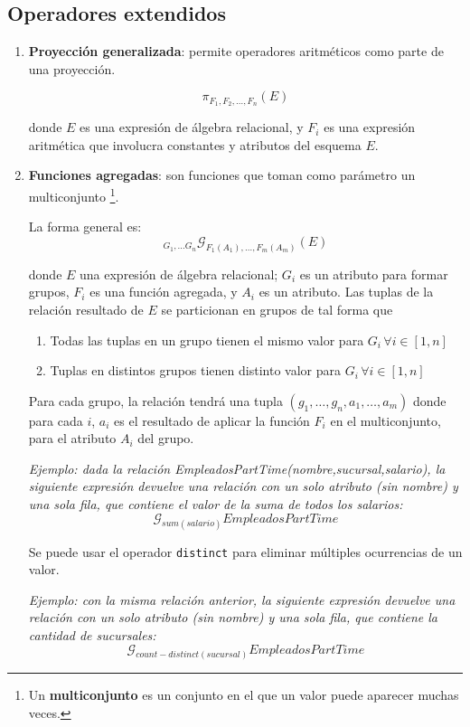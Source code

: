 \documentclass[a4paper, twoside]{article}
\newcommand{\codedir}{../resources/code} %
\begin{document}
\subsection{Operadores extendidos}
\begin{enumerate}
	\item \textbf{Proyección generalizada}: permite operadores aritméticos como parte de una proyección.

	\[
		\pi_{F_{1},F_{2},\dots,F_{n}}(E)
	\]

	donde $E$ es una expresión de álgebra relacional, y $F_{i}$ es una expresión aritmética que involucra constantes y atributos del esquema $E$.

	\item \textbf{Funciones agregadas}: son funciones que toman como parámetro un multiconjunto \footnote{Un \textbf{multiconjunto} es un conjunto en el que un valor puede aparecer muchas veces.}.
	

	La forma general es: 
	\[
		_{G_{1},\dots G_{n}}\mathcal{G}_{F_{1}(A_{1}),\dots,F_{m}(A_{m})}(E)
	\]

	donde $E$ una expresión de álgebra relacional; $G_{i}$ es un atributo para formar grupos, $F_{i}$ es una función agregada, y $A_{i}$ es un atributo. Las tuplas de la relación resultado de $E$ se particionan en grupos de tal forma que
	\begin{enumerate}
		\item Todas las tuplas en un grupo tienen el mismo valor para $G_{i}\,\forall i\in[1,n]$
		\item Tuplas en distintos grupos tienen distinto valor para $G_{i}\,\forall i\in[1,n]$
	\end{enumerate}

	Para cada grupo, la relación tendrá una tupla $(g_{1},\dots,g_{n},a_{1},\dots,a_{m})$ donde para cada $i$, $a_{i}$ es el resultado de aplicar la función $F_{i}$ en el multiconjunto, para el atributo $A_{i}$ del grupo.

	\emph{Ejemplo: dada la relación EmpleadosPartTime(nombre,sucursal,salario), la siguiente expresión devuelve una relación con un solo atributo (sin nombre) y una sola fila, que contiene el valor de la suma de todos los salarios:} 
	\[
		\mathcal{G}_{sum(salario)}EmpleadosPartTime
	\]

	Se puede usar el operador \texttt{distinct} para eliminar múltiples ocurrencias de un valor.

	\emph{Ejemplo: con la misma relación anterior, la siguiente expresión devuelve una relación con un solo atributo (sin nombre) y una sola fila, que contiene la cantidad de sucursales:}
	\[
		\mathcal{G}_{count-distinct(sucursal)}EmpleadosPartTime
	\]


\end{enumerate}
\end{document}
